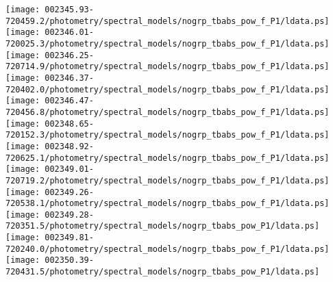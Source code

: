 \documentclass{aastex}
\begin{document}
\begin{figure*}[!ht]
\centering
\texttt{[image: 002345.93-720459.2/photometry/spectral\_models/nogrp\_tbabs\_pow\_f\_P1/ldata.ps]} \hfill 
\texttt{[image: 002346.01-720025.3/photometry/spectral\_models/nogrp\_tbabs\_pow\_f\_P1/ldata.ps]} \hfill 
\texttt{[image: 002346.25-720714.9/photometry/spectral\_models/nogrp\_tbabs\_pow\_f\_P1/ldata.ps]} \\ 
\vspace*{0.5in}
\texttt{[image: 002346.37-720402.0/photometry/spectral\_models/nogrp\_tbabs\_pow\_f\_P1/ldata.ps]} \hfill 
\texttt{[image: 002346.47-720456.8/photometry/spectral\_models/nogrp\_tbabs\_pow\_f\_P1/ldata.ps]} \hfill 
\texttt{[image: 002348.65-720152.3/photometry/spectral\_models/nogrp\_tbabs\_pow\_f\_P1/ldata.ps]} \\ 
\vspace*{0.5in}
\texttt{[image: 002348.92-720625.1/photometry/spectral\_models/nogrp\_tbabs\_pow\_f\_P1/ldata.ps]} \hfill 
\texttt{[image: 002349.01-720719.2/photometry/spectral\_models/nogrp\_tbabs\_pow\_f\_P1/ldata.ps]} \hfill 
\texttt{[image: 002349.26-720538.1/photometry/spectral\_models/nogrp\_tbabs\_pow\_f\_P1/ldata.ps]} \\ 
\vspace*{0.5in}
\texttt{[image: 002349.28-720351.5/photometry/spectral\_models/nogrp\_tbabs\_pow\_P1/ldata.ps]} \hfill 
\texttt{[image: 002349.81-720240.0/photometry/spectral\_models/nogrp\_tbabs\_pow\_f\_P1/ldata.ps]} \hfill 
\texttt{[image: 002350.39-720431.5/photometry/spectral\_models/nogrp\_tbabs\_pow\_P1/ldata.ps]} \\ 
\vspace*{0.5in}
\end{figure*}
\clearpage
\end{document}
